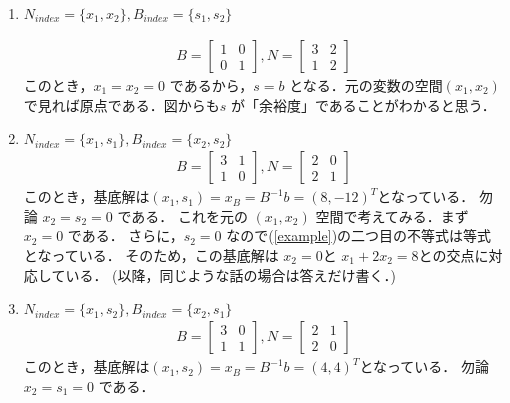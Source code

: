 \documentclass[11pt, a4]{article}
\begin{document}
\begin{enumerate}
\item $N_{index} = \{x_1, x_2\}, B_{index} = \{s_1, s_2\}$
  
\begin{eqnarray}
  B =
  \left[
  \begin{array}{cc}
    1&0\\
    0&1
  \end{array}
  \right]
  ,
  N =
  \left[
  \begin{array}{cc}
    3&2\\
    1&2
  \end{array}
  \right]
\end{eqnarray}
このとき，$x_1 = x_2 = 0$ であるから，$s = b$ となる．元の変数の空間$(x_1, x_2)$ で見れば原点である．図からも$s$ が「余裕度」であることがわかると思う．
  
\item $N_{index} = \{x_1, s_1\}, B_{index} = \{x_2, s_2\}$
\begin{eqnarray}
  B =
  \left[
  \begin{array}{cc}
    3&1\\
    1&0
  \end{array}
  \right]
  ,
  N =
  \left[
  \begin{array}{cc}
    2&0\\
    2&1
  \end{array}
  \right]
\end{eqnarray}
このとき，基底解は$(x_1, s_1) = x_B = B^{-1}b = (8, -12)^T$となっている．
勿論 $x_2 = s_2 = 0$ である．
これを元の $(x_1, x_2)$ 空間で考えてみる．まず $x_2 = 0$ である．
さらに，$s_2 = 0$ なので(\ref{example})の二つ目の不等式は等式となっている．
そのため，この基底解は $x_2 = 0$と $x_1 + 2 x_2 = 8$との交点に対応している．
(以降，同じような話の場合は答えだけ書く．)

\item $N_{index} = \{x_1, s_2\}, B_{index} = \{x_2, s_1\}$
\begin{eqnarray}
  B =
  \left[
  \begin{array}{cc}
    3&0\\
    1&1
  \end{array}
  \right]
  ,
  N =
  \left[
  \begin{array}{cc}
    2&1\\
    2&0
  \end{array}
  \right]
\end{eqnarray}
このとき，基底解は$(x_1, s_2) = x_B = B^{-1}b = (4, 4)^T$となっている．
勿論 $x_2 = s_1 = 0$ である．


\end{enumerate}
\end{document}
